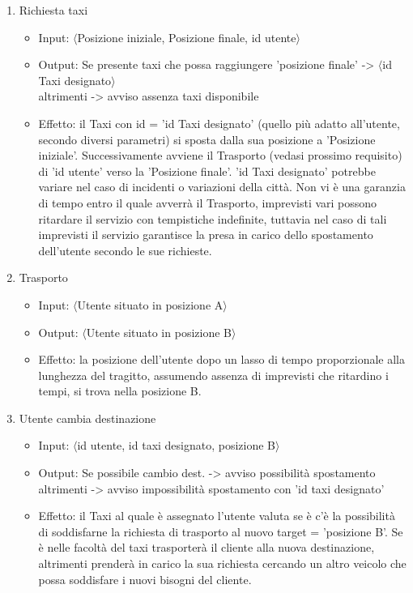 \begin{enumerate}
	\item Richiesta taxi
		\begin{itemize}
			\item Input:  $\langle$Posizione iniziale, Posizione finale, id utente$\rangle$
			\item Output: Se presente taxi che possa raggiungere 'posizione finale' -> $\langle$id Taxi designato$\rangle$ \\
						  altrimenti -> avviso assenza taxi disponibile
			\item Effetto: il Taxi con id = 'id Taxi designato' (quello più adatto all'utente, secondo diversi parametri) si sposta dalla sua posizione a 'Posizione iniziale'. Successivamente avviene il Trasporto (vedasi prossimo requisito) di 'id utente' verso la 'Posizione finale'. 'id Taxi designato' potrebbe variare nel caso di incidenti o variazioni della città. Non vi è una garanzia di tempo entro il quale avverrà il Trasporto, imprevisti vari possono ritardare il servizio con tempistiche indefinite, tuttavia nel caso di tali imprevisti il servizio garantisce la presa in carico dello spostamento dell'utente secondo le sue richieste.
		\end{itemize}

	\item Trasporto
		\begin{itemize}
			\item Input:  $\langle$Utente situato in posizione A$\rangle$
			\item Output: $\langle$Utente situato in posizione B$\rangle$
			\item Effetto: la posizione dell'utente dopo un lasso di tempo proporzionale alla lunghezza del tragitto, assumendo assenza di imprevisti che ritardino i tempi, si trova nella posizione B.
		\end{itemize}

	\item Utente cambia destinazione
		\begin{itemize}
			\item Input: $\langle$id utente, id taxi designato, posizione B$\rangle$
			\item Output: Se possibile cambio dest. -> avviso possibilità spostamento \\
						  altrimenti -> avviso impossibilità spostamento con 'id taxi designato'
			\item Effetto: il Taxi al quale è assegnato l'utente valuta se è c'è la possibilità di soddisfarne la richiesta di trasporto al nuovo target = 'posizione B'. Se è nelle facoltà del taxi trasporterà il cliente alla nuova destinazione, altrimenti prenderà in carico la sua richiesta cercando un altro veicolo che possa soddisfare i nuovi bisogni del cliente.
		\end{itemize}
	

\end{enumerate}

